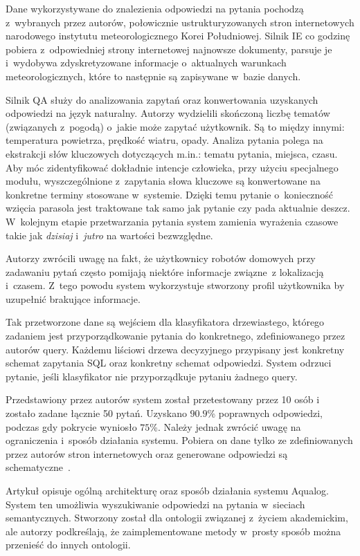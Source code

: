 Dane wykorzystywane do znalezienia odpowiedzi na pytania pochodzą z~wybranych przez autorów, połowicznie ustrukturyzowanych stron internetowych narodowego instytutu meteorologicznego Korei Południowej. Silnik IE co godzinę pobiera z~odpowiedniej strony internetowej najnowsze dokumenty, parsuje je i~wydobywa zdyskretyzowane informacje o~aktualnych warunkach meteorologicznych, które to następnie są zapisywane w~bazie danych. 

Silnik QA służy do analizowania zapytań oraz konwertowania uzyskanych odpowiedzi na język naturalny. Autorzy \cite{restrictedWeather} wydzielili skończoną liczbę tematów (związanych z~pogodą) o~jakie może zapytać użytkownik. Są to między innymi: temperatura powietrza, prędkość wiatru, opady. Analiza pytania polega na ekstrakcji słów kluczowych dotyczących m.in.: tematu pytania, miejsca, czasu. Aby móc zidentyfikować dokładnie intencje człowieka, przy użyciu specjalnego modułu, wyszczególnione z~zapytania słowa kluczowe są konwertowane na konkretne terminy stosowane w~systemie. Dzięki temu pytanie o~konieczność wzięcia parasola jest traktowane tak samo jak pytanie czy pada aktualnie deszcz. W~kolejnym etapie przetwarzania pytania system zamienia wyrażenia czasowe takie jak \textit{dzisiaj} i~\textit{jutro} na wartości bezwzględne.

Autorzy \cite{restrictedWeather} zwrócili uwagę na fakt, że użytkownicy robotów domowych przy zadawaniu pytań często pomijają niektóre informacje związne~z lokalizacją i~czasem. Z~tego powodu system wykorzystuje stworzony profil użytkownika by uzupełnić brakujące informacje.

Tak przetworzone dane są wejściem dla klasyfikatora drzewiastego, którego zadaniem jest przyporządkowanie pytania do konkretnego, zdefiniowanego przez autorów query. Każdemu liściowi drzewa decyzyjnego przypisany jest konkretny schemat zapytania SQL oraz konkretny schemat odpowiedzi. System odrzuci pytanie, jeśli klasyfikator nie przyporządkuje pytaniu żadnego query.

Przedstawiony przez autorów \cite{restrictedWeather} system został przetestowany przez 10 osób i~ zostało zadane łącznie 50 pytań. Uzyskano $\num{90.9}$\% poprawnych odpowiedzi, podczas gdy pokrycie wyniosło $\num{75}$\%. Należy jednak zwrócić uwagę na ograniczenia i~sposób działania systemu. Pobiera on dane tylko ze zdefiniowanych przez autorów stron internetowych oraz generowane odpowiedzi są schematyczne~\cite{restrictedWeather}.

Artykuł \cite{lopez2005aqualog} opisuje ogólną architekturę oraz sposób działania systemu Aqualog. System ten umożliwia wyszukiwanie odpowiedzi na pytania w~sieciach semantycznych. Stworzony został dla ontologii związanej z~życiem akademickim, ale autorzy podkreślają, że zaimplementowane metody w~prosty sposób można przenieść do innych ontologii.


